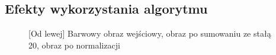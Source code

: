 \documentclass[a4paper,12pt, titlepage]{report}
\begin{document}
\subsection*{Efekty wykorzystania algorytmu}
\begin{figure}[h]
    \centering
    \caption{[Od lewej] Barwowy obraz wejściowy, obraz po sumowaniu ze stałą 20, obraz po normalizacji}%
    \label{fig:rysunek}%
\end{figure}
\FloatBarrier
\end{document}
